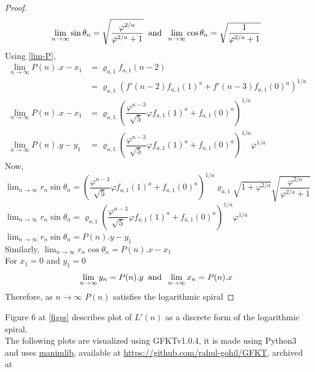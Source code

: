 \documentclass[preprint,12pt]{elsarticle}
\begin{document}
\begin{proof}
	$$\lim_{n \to \infty}\sin\theta_n = \sqrt{\dfrac{\varphi^{2/a}}{\varphi^{2/a}+1}}\hspace{2mm}\text{and}\hspace{2mm}\lim_{n \to \infty}\cos\theta_n = \sqrt{\dfrac{1}{\varphi^{2/a}+1}}$$
	Using \ref{lim-P},\\
	\begin{align*}
		\lim_{n \to \infty}P(n).x-x_1 &= \varrho_{a,1}f_{a,1}(n-2)\\
		&=\varrho_{a,1}\left(f'(n-2)f_{a,1}(1)^a+f'(n-3)f_{a,1}(0)^a\right)^{1/a}\\
		\lim_{n \to \infty}P(n).x-x_1&=\varrho_{a,1}\left(\dfrac{\varphi^{n-3}}{\sqrt{5}}\varphi f_{a,1}(1)^a+f_{a,1}(0)^a\right)^{1/a}\\
		\lim_{n \to \infty}P(n).y - y_1 &= \varrho_{a,1}\left(\dfrac{\varphi^{n-3}}{\sqrt{5}}\varphi f_{a,1}(1)^a+f_{a,1}(0)^a\right)^{1/a} \varphi^{1/a}
 	\end{align*}
 	Now,\\
 	$\displaystyle\lim_{n \to \infty}r_n\sin\theta_n=\left(\dfrac{\varphi^{n-3}}{\sqrt{5}}\varphi f_{a,1}(1)^a+f_{a,1}(0)^a\right)^{1/a}\varrho_{a,1}\sqrt{1+\varphi^{2/a}}\sqrt{\dfrac{\varphi^{2/a}}{\varphi^{2/a}+1}} $\\
 	$\displaystyle\lim_{n \to \infty}r_n\sin\theta_n=\varrho_{a,1}\left(\dfrac{\varphi^{n-3}}{\sqrt{5}}\varphi f_{a,1}(1)^a+f_{a,1}(0)^a\right)^{1/a} \varphi^{1/a}$\\
 	$\displaystyle\lim_{n \to \infty}r_n\sin\theta_n=P(n).y-y_1$\\
 	Similarly, $\displaystyle\lim_{n \to \infty}r_n\cos\theta_n=P(n).x-x_1$\\
	For $x_1 = 0$ and $y_1 = 0$
	$$\lim_{n \to \infty}y_n = P(n).y\hspace{2mm}\text{and}\hspace{2mm}\lim_{n \to \infty}x_n = P(n).x$$
	Therefore, as $n \to \infty$ $P(n)$ satisfies the logarithmic spiral
\end{proof}
Figure 6 at \ref{figss} describes plot of $L'(n)$ as a discrete form of the logarithmic spiral.\\
The following plots are visualized using GFKTv1.0.4\cite{rahulgohil_2020}, it is made using Python3 and uses \href{https://github.com/3b1b/manim}{manimlib}, available at \href{https://github.com/rahul-gohil/GFKT}{https://github.com/rahul-gohil/GFKT}, archived at 
\end{document}
